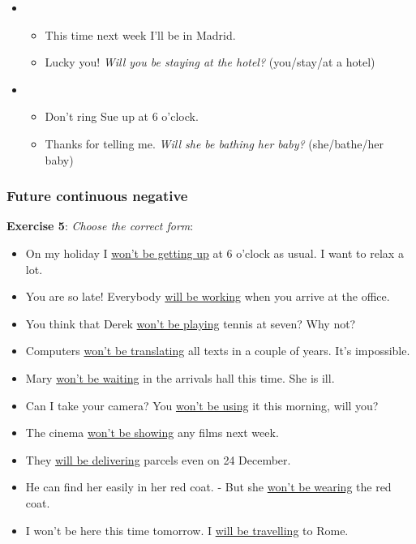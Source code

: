 \begin{itemize}
\item
\begin{itemize}
\item This time next week I'll be in Madrid.
\item Lucky you! \textit{Will you be staying at the hotel?} (you/stay/at a hotel) 
\end{itemize}

\item
\begin{itemize}
\item Don't ring Sue up at 6 o'clock.
\item Thanks for telling me. \textit{Will she be bathing her baby?} (she/bathe/her baby) 
\end{itemize}

\end{itemize}

\subsubsection{Future continuous negative}

\textbf{Exercise 5}: \textit{Choose the correct form}:

\begin{itemize}

\item On my holiday I \underline{won't be getting up} at 6 o'clock as usual. I want to relax a lot.
\item You are so late! Everybody \underline{will be working} when you arrive at the office.
\item You think that Derek \underline{won't be playing} tennis at seven? Why not?
\item Computers \underline{won't be translating} all texts in a couple of years. It's impossible.
\item Mary \underline{won't be waiting} in the arrivals hall this time. She is ill.
\item Can I take your camera? You \underline{won't be using} it this morning, will you?
\item The cinema \underline{won't be showing} any films next week.
\item They \underline{will be delivering} parcels even on 24 December.
\item He can find her easily in her red coat. - But she \underline{won't be wearing} the red coat.
\item I won't be here this time tomorrow. I \underline{will be travelling} to Rome.
\end{itemize}

